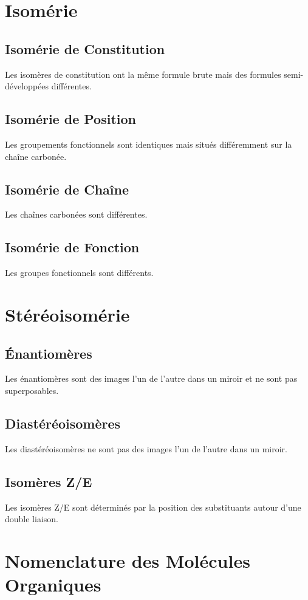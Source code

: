 \documentclass[12pt]{article}
\begin{document}
\section{Isomérie}
\subsection{Isomérie de Constitution}
Les isomères de constitution ont la même formule brute mais des formules semi-développées différentes.

\subsection{Isomérie de Position}
Les groupements fonctionnels sont identiques mais situés différemment sur la chaîne carbonée.

\subsection{Isomérie de Chaîne}
Les chaînes carbonées sont différentes.

\subsection{Isomérie de Fonction}
Les groupes fonctionnels sont différents.

\section{Stéréoisomérie}
\subsection{Énantiomères}
Les énantiomères sont des images l'un de l'autre dans un miroir et ne sont pas superposables.

\subsection{Diastéréoisomères}
Les diastéréoisomères ne sont pas des images l'un de l'autre dans un miroir.

\subsection{Isomères Z/E}
Les isomères Z/E sont déterminés par la position des substituants autour d'une double liaison.

\section{Nomenclature des Molécules Organiques}
\end{document}
